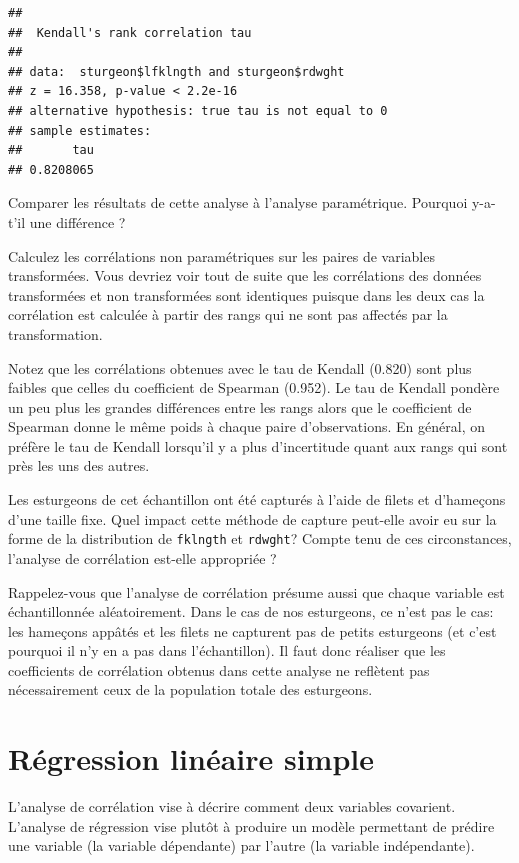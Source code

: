 \documentclass[
  12pt,
]{book}
\begin{document}
\begin{verbatim}
## 
##  Kendall's rank correlation tau
## 
## data:  sturgeon$lfklngth and sturgeon$rdwght
## z = 16.358, p-value < 2.2e-16
## alternative hypothesis: true tau is not equal to 0
## sample estimates:
##       tau 
## 0.8208065
\end{verbatim}

Comparer les résultats de cette analyse à l'analyse paramétrique.
Pourquoi y-a-t'il une différence ?

Calculez les corrélations non paramétriques sur les paires de variables transformées.
Vous devriez voir tout de suite que les corrélations des données transformées et non transformées sont identiques puisque dans les deux cas la corrélation est calculée à partir des rangs qui ne sont pas affectés par la transformation.

Notez que les corrélations obtenues avec le tau de Kendall (0.820) sont plus faibles que celles du coefficient de Spearman (0.952).
Le tau de Kendall pondère un peu plus les grandes différences entre les rangs alors que le coefficient de Spearman donne le même poids à chaque paire d'observations.
En général, on préfère le tau de Kendall lorsqu'il y a plus d'incertitude quant aux rangs qui sont près les uns des autres.

Les esturgeons de cet échantillon ont été capturés à l'aide de filets et d'hameçons d'une taille fixe.
Quel impact cette méthode de capture peut-elle avoir eu sur la forme de la distribution de \texttt{fklngth} et \texttt{rdwght}?
Compte tenu de ces circonstances, l'analyse de corrélation est-elle appropriée ?

Rappelez-vous que l'analyse de corrélation présume aussi que chaque variable est échantillonnée aléatoirement.
Dans le cas de nos esturgeons, ce n'est pas le cas: les hameçons appâtés et les filets ne capturent pas de petits esturgeons (et c'est pourquoi il n'y en a pas dans l'échantillon).
Il faut donc réaliser que les coefficients de corrélation obtenus dans cette analyse ne reflètent pas nécessairement ceux de la population totale des esturgeons.

\hypertarget{ruxe9gression-linuxe9aire-simple}{%
\section{Régression linéaire simple}\label{ruxe9gression-linuxe9aire-simple}}

L'analyse de corrélation vise à décrire comment deux variables covarient.
L'analyse de régression vise plutôt à produire un modèle permettant de prédire une variable (la variable dépendante) par l'autre (la variable indépendante).
\end{document}
